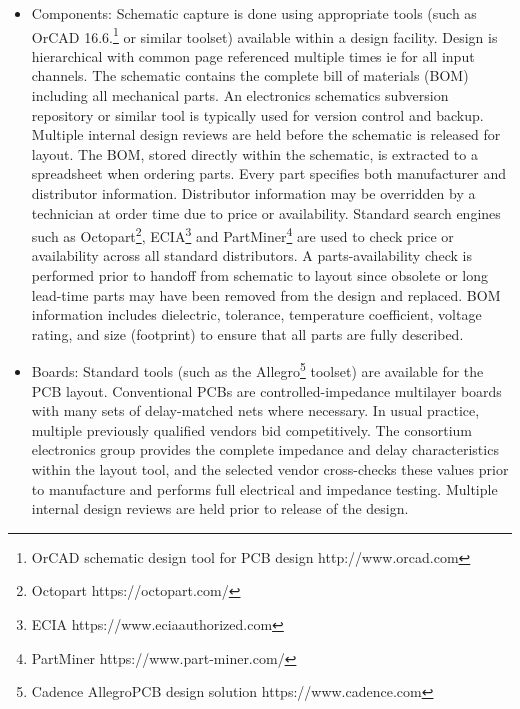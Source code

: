 \begin{itemize}

\item Components: Schematic capture is done using appropriate tools (such as OrCAD 16.6.\footnote{OrCAD\texttrademark{} schematic design tool for PCB design http://www.orcad.com} or similar toolset) available within a design facility. Design is hierarchical with common  page referenced multiple times ie for all input channels. 
The schematic contains the complete bill of materials (BOM) including all mechanical parts. An electronics schematics subversion
repository or similar tool is typically used for version control and backup. Multiple internal design reviews are held before the schematic is released %
for layout. The BOM, stored directly within the schematic, is extracted to a spreadsheet when ordering parts. Every part specifies %
both manufacturer and distributor information. Distributor information may be overridden by a technician at order time due to price or availability. Standard search engines such as Octopart\footnote{Octopart https://octopart.com/}, ECIA\footnote{ ECIA https://www.eciaauthorized.com} and PartMiner\footnote{PartMiner https://www.part-miner.com/} are used to check price or availability across all standard distributors. A parts-availability check %
is performed prior to handoff from schematic to layout since %
obsolete or long lead-time parts %
may have been removed from the design and replaced. BOM information includes dielectric, tolerance, temperature coefficient, voltage rating, and size (footprint) to ensure that all parts are fully described.

\item Boards: Standard tools (such as the Allegro\footnote{Cadence Allegro\textregistered PCB design solution https://www.cadence.com} toolset) are available for the PCB layout. Conventional PCBs are %
controlled-impedance multilayer boards with many sets of delay-matched nets where necessary. %
In usual practice, multiple previously qualified vendors bid competitively. The consortium electronics group provides the complete impedance and delay characteristics  within the layout tool, and the selected vendor cross-checks these values prior to manufacture and performs full electrical and impedance testing.  Multiple internal design reviews are held prior to release of the design.


\end{itemize}
